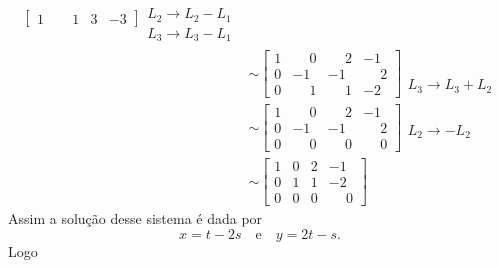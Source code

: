 \documentclass[12pt]{exam}
\begin{document}
\begin{enumerate}[label={\alph*})]
\begin{align*}
\begin{bmatrix}
                    1 & \phantom{-} 1 & 3 & -3
                \end{bmatrix}
                \begin{array}{l}
                    \phantom{x}\\
                    L_2 \to L_2 - L_1\\
                    L_3 \to L_3 - L_1
                \end{array}\\&\sim
                \begin{bmatrix}
                    1 & \phantom{-} 0 & \phantom{-} 2 & -1\\
                    0 & -1 & -1 & \phantom{-} 2\\
                    0 & \phantom{-} 1 & \phantom{-} 1 & -2
                \end{bmatrix}
                \begin{array}{l}
                    \phantom{x}\\
                    \phantom{x}\\
                    L_3 \to L_3 + L_2
                \end{array}\\&\sim
                \begin{bmatrix}
                    1 & \phantom{-} 0 & \phantom{-} 2 & -1\\
                    0 & -1 & -1 & \phantom{-} 2\\
                    0 & \phantom{-} 0 & \phantom{-} 0 & \phantom{-} 0
                \end{bmatrix}
                \begin{array}{l}
                    \phantom{x}\\
                    L_2 \to -L_2
                    \phantom{x}\\
                \end{array}\\&\sim
                \begin{bmatrix}
                    1 & 0 & 2 & -1\\
                    0 & 1 & 1 & -2\\
                    0 & 0 & 0 & \phantom{-} 0
                \end{bmatrix}
            \end{align*}
            Assim a solução desse sistema é dada por
            \[
                x = t - 2s \quad \mbox{e}\quad y = 2t - s.
            \]
            Logo

\end{enumerate}
\end{document}
